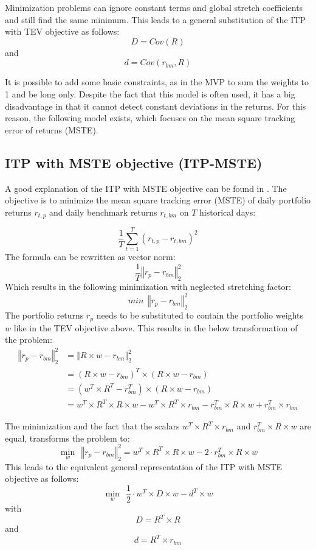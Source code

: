 \documentclass[
  oneside]{book}
\begin{document}
Minimization problems can ignore constant terms and global stretch coefficients and still find the same minimum. This leads to a general substitution of the ITP with TEV objective as follows:
\[
  D = Cov(R)
\]
and
\[
d = Cov(r_{bm}, R)
\]

It is possible to add some basic constraints, as in the MVP to sum the weights to 1 and be long only. Despite the fact that this model is often used, it has a big disadvantage in that it cannot detect constant deviations in the returns. For this reason, the following model exists, which focuses on the mean square tracking error of returns (MSTE).

\hypertarget{ITPMSTE}{%
\subsection{ITP with MSTE objective (ITP-MSTE)}\label{ITPMSTE}}

A good explanation of the ITP with MSTE objective can be found in \citep{AhBa2017}. The objective is to minimize the mean square tracking error (MSTE) of daily portfolio returns \(r_{t, p}\) and daily benchmark returns \(r_{t, bm}\) on \(T\) historical days:

\[
  \frac{1}{T} \sum^T_{t=1}(r_{t, p}-r_{t, bm})^2
\]
The formula can be rewritten as vector norm:
\[
  \frac{1}{T} \left\Vert r_{p}-r_{bm} \right\Vert_2^2
\]
Which results in the following minimization with neglected stretching factor:
\[
 min \ \  \left\Vert r_{p}-r_{bm} \right\Vert_2^2
\]
The portfolio returns \(r_p\) needs to be substituted to contain the portfolio weights \(w\) like in the TEV objective above. This results in the below transformation of the problem:
\begin{align*}
  \left\Vert r_{p}-r_{bm} \right\Vert_2^2 &= \left\Vert R \times w-r_{bm} \right\Vert_2^2 \\ 
  &= (R \times w-r_{bm})^T \times (R \times w-r_{bm}) \\ 
  &= (w^T \times R^T-r_{bm}^T) \times (R \times w-r_{bm}) \\ 
  &= w^T \times R^T \times R \times w - w^T \times R^T \times r_{bm} - r_{bm}^T \times R \times w + r_{bm}^T \times r_{bm} 
\end{align*}

The minimization and the fact that the scalars \(w^T \times R^T \times r_{bm}\) and \(r_{bm}^T \times R \times w\) are equal, transforms the problem to:
\[
  \min\limits_{w} \ \  \left\Vert r_{p}-r_{bm} \right\Vert_2^2 
  = w^T \times R^T \times R \times w - 2\cdot r_{bm}^T \times R \times w
\]
This leads to the equivalent general representation of the ITP with MSTE objective as follows:
\[
  \min\limits_{w} \ \ \frac{1}{2} \cdot w^T \times D \times w - d^T \times w
\]
with
\[
D = R^T \times R
\]
and
\[
  d = R^T \times r_{bm}
\]
\end{document}
